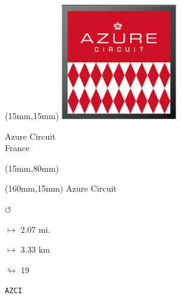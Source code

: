 \begin{textblock*}{50mm}(15mm,15mm)%
\includegraphics[width=50mm]{LG/2015-05-20_00072.png}
\par Azure Circuit\\ France
\end{textblock*}
\begin{textblock*}{185mm}(15mm,80mm)%
\end{textblock*}
\begin{textblock*}{40mm}(160mm,15mm)%
Azure Circuit
\par \Huge$\circlearrowleft$
\Large
\par$\mapsto$ 2.07 mi.
\par$\mapsto$ 3.33 km
\par$\looparrowright$ 19
\par\hfill\tiny\tt AZCI\\
\end{textblock*}
\null\newpage

